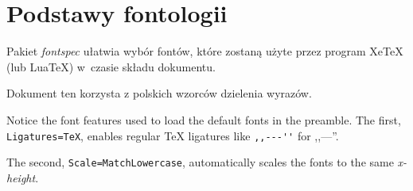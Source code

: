 \documentclass[a4paper,12pt]{article}
\begin{document}
\pagestyle{empty}

\section*{Podstawy fontologii}

Pakiet \emph{fontspec} ułatwia wybór fontów, które zostaną
użyte przez program Xe\TeX{} (lub Lua\TeX) w~czasie składu dokumentu.

Dokument ten korzysta z polskich wzorców dzielenia wyrazów.

\bigskip

Notice the font features used to load the default fonts in the preamble.
The first, \verb|Ligatures=TeX|, enables regular \TeX{} ligatures like
\verb|,,---''| for ,,---''.

The second, \verb|Scale=MatchLowercase|, automatically scales the fonts to
the same \emph{x-height}.
\end{document}
